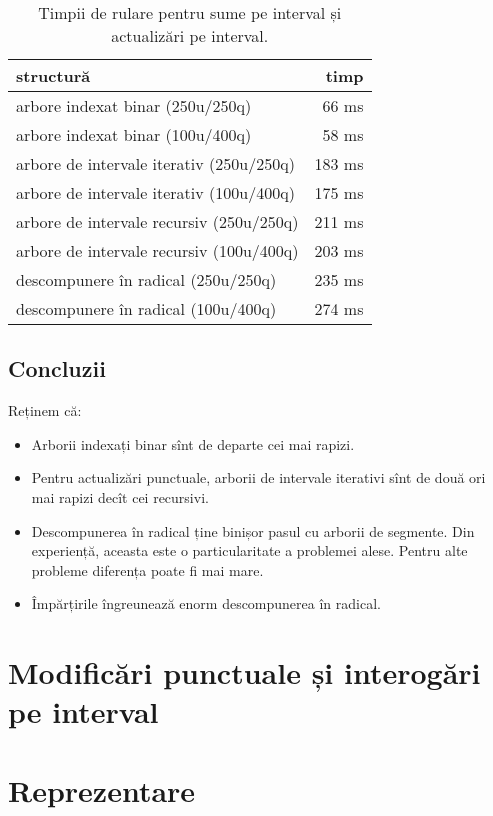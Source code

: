 \begin{table}[!htbp]
  \centering
  \begin{tabular}{lr}
    \textbf{structură} & \textbf{timp} \\
    \hline
     arbore indexat binar (250u/250q) & 66 ms \\
     arbore indexat binar (100u/400q) & 58 ms \\
     arbore de intervale iterativ (250u/250q) & 183 ms \\
     arbore de intervale iterativ (100u/400q) & 175 ms \\
     arbore de intervale recursiv (250u/250q) & 211 ms \\
     arbore de intervale recursiv (100u/400q) & 203 ms \\
     descompunere în radical (250u/250q) & 235 ms \\
     descompunere în radical (100u/400q) & 274 ms \\
    \hline
  \end{tabular}

  \caption{Timpii de rulare pentru sume pe interval și actualizări pe interval.}
\end{table}

\subsection{Concluzii}

Reținem că:

\begin{itemize}
  \item Arborii indexați binar sînt de departe cei mai rapizi.
  \item Pentru actualizări punctuale, arborii de intervale iterativi sînt de două ori mai rapizi decît cei recursivi.
  \item Descompunerea în radical ține binișor pasul cu arborii de segmente. Din experiență, aceasta este o particularitate a problemei alese. Pentru alte probleme diferența poate fi mai mare.
  \item Împărțirile îngreunează enorm descompunerea în radical.
\end{itemize}


\section{Modificări punctuale și interogări pe interval}

\section{Reprezentare}

